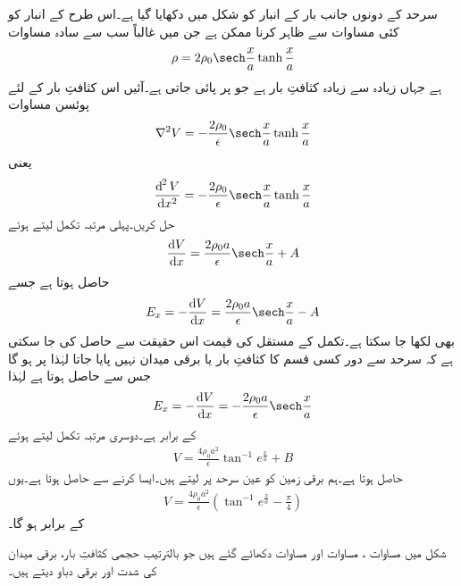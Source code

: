 سرحد کے دونوں جانب بار کے انبار کو شکل میں دکھایا گیا ہے۔اس طرح کے انبار کو کئی مساوات سے ظاہر کرنا ممکن ہے جن میں غالباً سب سے سادہ مساوات
\begin{align}\label{مساوات_لاپلاس_ڈایوڈ_بار-کثافت}
\rho=2 \rho_0 \sech \frac{x}{a} \tanh \frac{x}{a}
\end{align}
ہے جہاں زیادہ سے زیادہ کثافتِ بار  ہے جو  پر پائی جاتی ہے۔آئیں اس کثافتِ بار کے لئے پوئسن مساوات
\begin{align*}
\nabla^2 V=-\frac{2 \rho_0}{\epsilon} \sech \frac{x}{a} \tanh \frac{x}{a}
\end{align*}
یعنی
\begin{align*}
\frac{\dif^{\hspace{1pt}2} V}{\dif x^2}=-\frac{2 \rho_0}{\epsilon} \sech \frac{x}{a} \tanh \frac{x}{a}
\end{align*}
 حل کریں۔پہلی مرتبہ تکمل لیتے ہوئے
\begin{align*}
\frac{\dif V}{\dif x}=\frac{2\rho_0 a}{\epsilon} \sech \frac{x}{a}+A
\end{align*}
حاصل ہوتا  ہے جسے
\begin{align*}
E_x=-\frac{\dif V}{\dif x}=\frac{2\rho_0 a}{\epsilon} \sech \frac{x}{a}-A
\end{align*}
بھی لکھا جا سکتا ہے۔تکمل کے مستقل  کی قیمت اس حقیقت سے حاصل کی جا سکتی ہے کہ سرحد سے دور کسی قسم کا کثافتِ بار یا برقی میدان نہیں پایا جاتا لہٰذا  پر  ہو گا جس سے  حاصل ہوتا ہے لہٰذا
 \begin{align}\label{مساوات_لاپلاس_ڈایوڈ_برقی_میدان}
E_x=-\frac{\dif V}{\dif x}=-\frac{2\rho_0 a}{\epsilon} \sech \frac{x}{a}
\end{align}
کے برابر ہے۔دوسری مرتبہ تکمل لیتے ہوئے
\begin{align*}
V=\frac{4 \rho_0 a^2}{\epsilon} \tan^{-1} e^{\frac{x}{a}}+B
\end{align*}
حاصل ہوتا ہے۔ہم برقی زمین کو عین سرحد پر لیتے ہیں۔ایسا کرنے سے  حاصل ہوتا ہے۔یوں
\begin{align}\label{مساوات_لاپلاس_ڈایوڈ_برقی_دباو}
V=\frac{4 \rho_0 a^2}{\epsilon} \left(\tan^{-1} e^{\frac{x}{a}}-\frac{\pi}{4}\right)
\end{align}
کے برابر ہو گا۔

شکل میں مساوات ، مساوات  اور مساوات  دکھائے گئے ہیں جو بالترتیب حجمی کثافتِ بار، برقی میدان کی شدت اور برقی دباو دیتے ہیں۔


